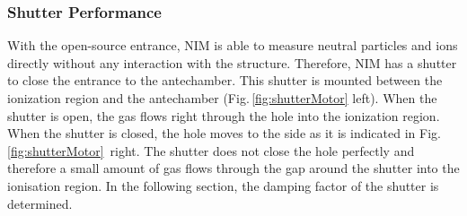 		\subsubsection{Shutter Performance } \label{subsubsec:motorflow}
		With the open-source entrance, NIM is able to measure neutral particles and ions directly without any interaction with the structure. Therefore, NIM has a shutter to close the entrance to the antechamber. This shutter is mounted between the ionization region and the antechamber (Fig.\,\ref{fig:shutterMotor} left). When the shutter is open, the gas flows right through the hole into the ionization region. When the shutter is closed, the hole moves to the side as it is indicated in Fig.\,\ref{fig:shutterMotor}~right. The shutter does not close the hole perfectly and therefore a small amount of gas flows through the gap around the shutter into the ionisation region. In the following section, the damping factor of the shutter is determined.\\
